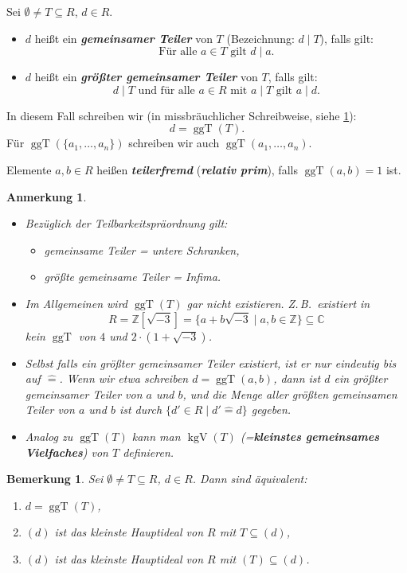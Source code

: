 \documentclass[a4paper, twoside, 11pt, ngerman]{report}
\newcommand{\CC}{\mathds C}
\newcommand{\ZZ}{\mathds Z}
\newcommand{\assoc}{\mathrel{\widehat{=}}}
\DeclareMathOperator{\ggT}{ggT}
\DeclareMathOperator{\kgV}{kgV}
\theoremstyle{definistyle}
\newtheorem{bem}[satz]{Bemerkung}
\newtheorem{anm}[satz]{Anmerkung}
\theoremstyle{remark}
\newcommand{\defn}[1]{\textit{\bfseries #1}}
\begin{document}
\begin{def}\label{bem:ggT}
Sei $\emptyset \neq T \subseteq R$, $d\in R$.
\begin{itemize}
    \item $d$ heißt ein \defn{gemeinsamer Teiler} von $T$ (Bezeichnung: $d \mid T$), falls gilt:
    \[
    \text{Für alle } a \in T \text{ gilt } d \mid a.
    \]
    \item $d$ heißt ein \defn{größter gemeinsamer Teiler} von $T$, falls gilt:
    \[
    d \mid T \text{ und für alle } a \in R \text{ mit } a \mid T \text{ gilt } a \mid d.
    \]
\end{itemize}
In diesem Fall schreiben wir (in missbräuchlicher Schreibweise, siehe \ref{anm:ggT_existenz}): \[d = \ggT(T).\] 
Für $\ggT(\{a_1, \dots, a_n\})$ schreiben wir auch $\ggT(a_1, \dots, a_n)$.

Elemente $a,b\in R$ heißen \defn{teilerfremd} (\defn{relativ prim}), falls $\ggT(a,b)=1$ ist.
\end{def}

\begin{anm}\label{anm:ggT_existenz}
\begin{itemize}
    \item Bezüglich der Teilbarkeitspräordnung gilt:
    \begin{itemize}
        \item gemeinsame Teiler = untere Schranken,
        \item größte gemeinsame Teiler = Infima.
    \end{itemize}
    \item Im Allgemeinen wird $\ggT(T)$ gar nicht existieren. Z.\,B.\ existiert in 
    \[R = \ZZ[\sqrt{-3}] = \{a + b \sqrt{-3} \mid a, b \in \ZZ \} \subseteq \CC\]
    kein $\ggT$ von $4$ und $2 \cdot (1 + \sqrt{-3})$.
    \item Selbst falls ein größter gemeinsamer Teiler existiert, ist er nur eindeutig bis auf $\assoc$. Wenn wir etwa schreiben $d = \ggT(a, b)$, dann ist $d$ ein größter gemeinsamer Teiler von $a$ und $b$, und die Menge aller größten gemeinsamen Teiler von $a$ und $b$ ist durch $\{d' \in R \mid d' \assoc d\}$ gegeben.
    \item Analog zu $\ggT(T)$ kann man $\kgV(T)$ (=\defn{kleinstes gemeinsames Vielfaches}) von $T$ definieren.    
\end{itemize}
\end{anm}



\begin{bem}\label{bem:ggT_hauptideal}
Sei $\emptyset \neq T \subseteq R$, $d \in R$. Dann sind äquivalent:
\begin{enumerate}[label=(\roman*)]
    \item $d = \ggT(T)$,
    \item $(d)$ ist das kleinste Hauptideal von $R$ mit $T \subseteq (d)$,
    \item $(d)$ ist das kleinste Hauptideal von $R$ mit $(T) \subseteq (d)$.
\end{enumerate}
\end{bem}
\end{document}

